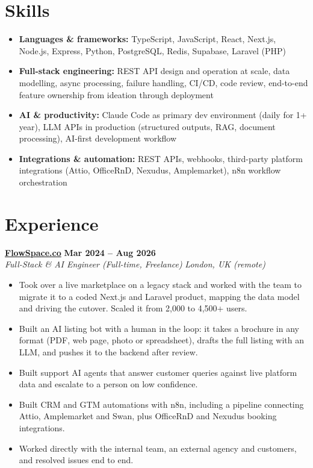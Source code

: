 \documentclass[a4paper,10pt]{article}
\newcommand{\role}[4]{%
 \textbf{#1} \hfill \textbf{#2}\\[1pt]%
 \textit{#3} \hfill \textit{#4}\\[2pt]%
}
\begin{document}
\section{Skills}
\begin{itemize}
 \item \textbf{Languages \& frameworks:} TypeScript, JavaScript, React, Next.js, Node.js, Express, Python, PostgreSQL, Redis, Supabase, Laravel (PHP)
 \item \textbf{Full-stack engineering:} REST API design and operation at scale, data modelling, async processing, failure handling, CI/CD, code review, end-to-end feature ownership from ideation through deployment
 \item \textbf{AI \& productivity:} Claude Code as primary dev environment (daily for 1+ year), LLM APIs in production (structured outputs, RAG, document processing), AI-first development workflow
 \item \textbf{Integrations \& automation:} REST APIs, webhooks, third-party platform integrations (Attio, OfficeRnD, Nexudus, Amplemarket), n8n workflow orchestration
\end{itemize}

\section{Experience}

\role{\href{https://flowspace.co}{FlowSpace.co}}{Mar 2024 -- Aug 2026}{Full-Stack \& AI Engineer (Full-time, Freelance)}{London, UK (remote)}
\begin{itemize}
 \item Took over a live marketplace on a legacy stack and worked with the team to migrate it to a coded Next.js and Laravel product, mapping the data model and driving the cutover. Scaled it from 2,000 to 4,500+ users.
 \item Built an AI listing bot with a human in the loop: it takes a brochure in any format (PDF, web page, photo or spreadsheet), drafts the full listing with an LLM, and pushes it to the backend after review.
 \item Built support AI agents that answer customer queries against live platform data and escalate to a person on low confidence.
 \item Built CRM and GTM automations with n8n, including a pipeline connecting Attio, Amplemarket and Swan, plus OfficeRnD and Nexudus booking integrations.
 \item Worked directly with the internal team, an external agency and customers, and resolved issues end to end.
\end{itemize}
\end{document}
